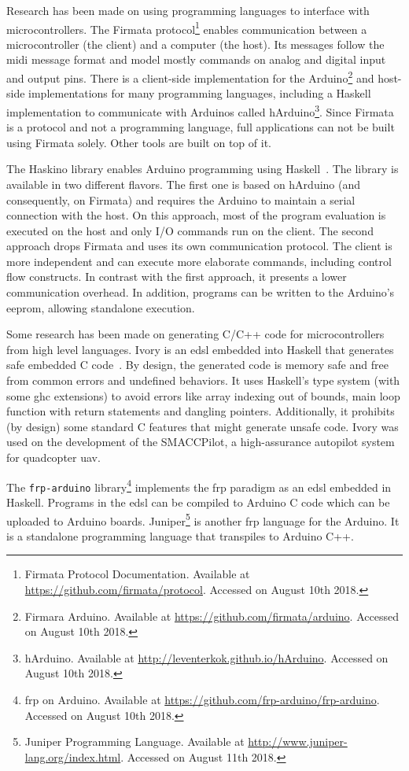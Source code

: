 Research has been made on using programming languages to interface with microcontrollers. The Firmata protocol\footnote{Firmata Protocol Documentation. Available at \url{https://github.com/firmata/protocol}. Accessed on August 10th 2018.} enables communication between a microcontroller (the client) and a computer (the host). Its messages follow the \acs{midi} message format and model mostly commands on analog and digital input and output pins. There is a client-side implementation for the Arduino\footnote{Firmara Arduino. Available at \url{https://github.com/firmata/arduino}. Accessed on August 10th 2018.} and host-side implementations for many programming languages, including a Haskell implementation to communicate with Arduinos called hArduino\footnote{hArduino. Available at \url{http://leventerkok.github.io/hArduino}. Accessed on August 10th 2018.}. Since Firmata is a protocol and not a programming language, full applications can not be built using Firmata solely. Other tools are built on top of it.

The Haskino library enables Arduino programming using Haskell~\cite{haskino}. The library is available in two different flavors. The first one is based on hArduino (and consequently, on Firmata) and requires the Arduino to maintain a serial connection with the host. On this approach, most of the program evaluation is executed on the host and only I/O commands run on the client. The second approach drops Firmata and uses its own communication protocol. The client is more independent and can execute more elaborate commands, including control flow constructs. In contrast with the first approach, it presents a lower communication overhead. In addition, programs can be written to the Arduino's \acs{eeprom}, allowing standalone execution.

Some research has been made on generating C/C++ code for microcontrollers from high level languages. Ivory is an \ac{edsl} embedded into Haskell that generates safe embedded C code~\cite{ivory1,ivory2}. By design, the generated code is memory safe and free from common errors and undefined behaviors. It uses Haskell's type system (with some \ac{ghc} extensions) to avoid errors like array indexing out of bounds, main loop function with return statements and dangling pointers. Additionally, it prohibits (by design) some standard C features that might generate unsafe code. Ivory was used on the development of the SMACCPilot, a high-assurance autopilot system for quadcopter \ac{uav}.

The \texttt{frp-arduino} library\footnote{\acs{frp} on Arduino. Available at \url{https://github.com/frp-arduino/frp-arduino}. Accessed on August 10th 2018.} implements the \ac{frp} paradigm as an \ac{edsl} embedded in Haskell. Programs in the \ac{edsl} can be compiled to Arduino C code which can be uploaded to Arduino boards. Juniper\footnote{Juniper Programming Language. Available at \url{http://www.juniper-lang.org/index.html}. Accessed on August 11th 2018.} is another \ac{frp} language for the Arduino. It is a standalone programming language that transpiles to Arduino C++.

